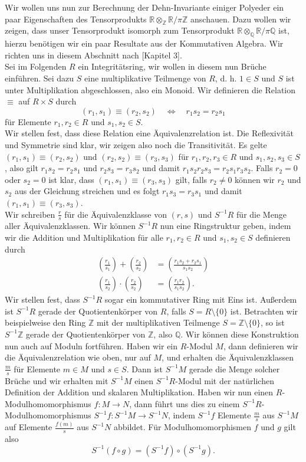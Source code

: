 \documentclass[11pt,titlepage]{article}
\newcommand{\setZ}{\mathbb{Z}}
\newcommand{\setQ}{\mathbb{Q}}
\newcommand{\setR}{\mathbb{R}}
\theoremstyle{definition}
\theoremstyle{remark}
\begin{document}
	Wir wollen uns nun zur Berechnung der Dehn-Invariante einiger Polyeder ein paar Eigenschaften des Tensorprodukts $\setR\otimes_{\setZ}\setR /\pi\setZ$ anschauen. Dazu wollen wir zeigen, dass unser Tensorprodukt isomorph zum Tensorprodukt  
	$\setR\otimes_{\setQ}\setR /\pi\setQ$ ist, hierzu benötigen wir ein 
	paar Resultate 
	aus der Kommutativen Algebra. Wir richten uns in diesem Abschnitt 
	nach \cite{introductiontocomalg}[Kapitel 3].\\
	Sei im Folgenden $R$ ein Integritätsring, wir wollen in diesem nun 
	Brüche einführen. Sei dazu $S$ eine multiplikative Teilmenge von $R$, d. h.
	$1\in S$ und $S$ ist unter Multiplikation abgeschlossen, also ein Monoid. Wir 
	definieren die Relation $\equiv$ auf $R\times S$ durch
	\[(r_1,s_1)\equiv(r_2,s_2)\quad \Leftrightarrow\quad r_1 s_2 =r_2 s_1\]
	für Elemente $r_1,r_2\in R$ und $s_1,s_2\in S$. \\
	Wir stellen fest, dass diese Relation  eine Äquivalenzrelation ist. Die 
	Reflexivität und Symmetrie sind klar, wir zeigen also noch die Transitivität.
	Es gelte $(r_1,s_1)\equiv(r_2,s_2)$ und $(r_2,s_2)\equiv(r_3,s_3)$ für 
	$r_1,r_2,r_3\in R$ und $s_1,s_2,s_3\in S$, also gilt $r_1 s_2= r_2 s_1$ und 
	$r_2 s_3 =r_3 s_2$ und damit $r_1 s_2 r_2 s_3 =r_2 s_1 r_3 s_2$. Falls $r_2=0$ 
	oder $s_2=0$ 
	ist klar, dass $(r_1,s_1)\equiv(r_3,s_3)$ gilt, falls $r_2\neq 0$ können wir $r_2$ und $s_2$ aus der Gleichung streichen und es folgt 
	$r_1 s_3=r_3 s_1$ und damit $(r_1,s_1)\equiv(r_3,s_3)$. \\
	Wir schreiben $\frac{r}{s}$ für die Äquivalenzklasse 
	von $(r,s)$ und $S^{-1}R$ 
	für die Menge aller Äquivalenzklassen. 
	Wir können $S^{-1}R$ nun eine Ringstruktur geben, indem wir die Addition und Multiplikation für 
	alle $r_1,r_2\in R$ und $s_1,s_2\in S$ definieren durch
	\begin{align*}
		\left(\frac{r_1}{s_1}\right)+\left(\frac{r_2}{s_2}\right)
		&=\left(\frac{r_1s_2+r_2s_1}{s_1s_2}\right) \\
		\left(\frac{r_1}{s_2}\right)\cdot\left(\frac{r_2}{s_2}\right)
		&=\left(\frac{r_1r_2}{s_1s_2}\right).
	\end{align*}
	Wir stellen fest, dass 
	$S^{-1}R$ sogar ein kommutativer Ring mit Eins ist. Außerdem ist 
	$S^{-1}R$ gerade der Quotientenkörper von $R$, falls $S=R\setminus\{0\}$ ist. Betrachten wir beispielweise den Ring 
	$\setZ$ mit der multiplikativen Teilmenge $S=\setZ\setminus\{0\}$, so 
	ist $S^{-1}\setZ$ gerade der Quotientenkörper von $\setZ$, also 
	$\setQ$. Wir können diese Konstruktion nun auch auf Moduln fortführen. 
	Haben wir ein $R$-Modul $M$, dann definieren wir 
	die Äquivalenzrelation wie oben, nur auf $M$, und erhalten die 
	Äquivalenzklassen $\frac{m}{s}$ für Elemente $m\in M$ und $s\in S$. 
	Dann ist $S^{-1}M$ gerade die Menge solcher Brüche und wir erhalten 
	mit $S^{-1}M$ einen $S^{-1}R$-Modul mit der natürlichen Definition 
	der Addition und skalaren Multiplikation. Haben wir nun einen 
	$R$-Modulhomomorphismus $f:M\to N$, dann führt uns dies zu einem 
	$S^{-1}R$-Modulhomomorphismus $S^{-1}f:S^{-1}M\to S^{-1}N$, indem $S^{-1}f$ 
	Elemente $\frac{m}{s}$ aus $S^{-1}M$ auf Elemente $\frac{f(m)}{s}$ 
	aus $S^{-1}N$ abbildet. Für Modulhomomorphismen $f$ und $g$ gilt also 
	\[S^{-1}(f\circ g)=(S^{-1}f)\circ(S^{-1}g).\]
	
\end{document}
